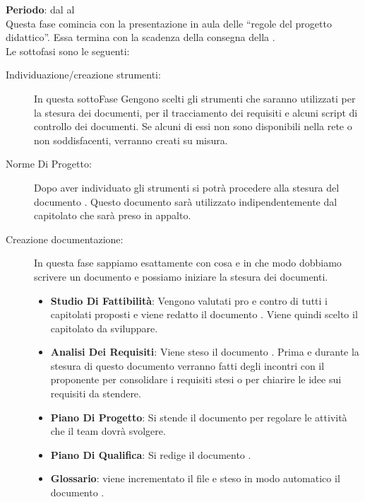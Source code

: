 	\textbf{Periodo}: dal  al  \\
	Questa fase comincia con la presentazione in aula delle “regole del progetto didattico”. Essa termina con la scadenza della consegna della .\\Le sottofasi sono le seguenti:
	\begin{description}
		\item[Individuazione/creazione strumenti:] In questa sottoFase Gengono scelti gli strumenti che saranno utilizzati per la stesura dei documenti, per il tracciamento dei requisiti e alcuni script di controllo dei documenti. Se alcuni di essi non sono disponibili nella rete o non soddisfacenti, verranno creati su misura.
		\item[Norme Di Progetto:] Dopo aver individuato gli strumenti si potrà procedere alla stesura del documento . Questo documento sarà utilizzato indipendentemente dal capitolato che sarà preso in appalto.
		\item[Creazione documentazione:] In questa fase sappiamo esattamente con cosa e in che modo dobbiamo scrivere un documento e possiamo iniziare la stesura dei documenti.
			\begin{itemize}
				\item \textbf{Studio Di Fattibilità}: Vengono valutati pro e contro di tutti i capitolati proposti e viene redatto il documento . Viene quindi scelto il capitolato da sviluppare.
				\item \textbf{Analisi Dei Requisiti}: Viene steso il documento . Prima e durante la stesura di questo documento verranno fatti degli incontri con il proponente per consolidare i requisiti stesi o per chiarire le idee sui requisiti da stendere.
				\item \textbf{Piano Di Progetto}: Si stende il documento  per regolare le attività che il team dovrà svolgere.
				\item \textbf{Piano Di Qualifica}: Si redige il documento .
				\item \textbf{Glossario}: viene incrementato il file   e steso in modo automatico il documento .
			\end{itemize}
	\end{description}
